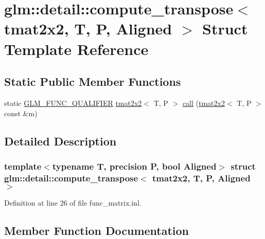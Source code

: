 \hypertarget{structglm_1_1detail_1_1compute__transpose_3_01tmat2x2_00_01_t_00_01_p_00_01_aligned_01_4}{}\section{glm\+::detail\+::compute\+\_\+transpose$<$ tmat2x2, T, P, Aligned $>$ Struct Template Reference}
\label{structglm_1_1detail_1_1compute__transpose_3_01tmat2x2_00_01_t_00_01_p_00_01_aligned_01_4}
\subsection*{Static Public Member Functions}
\begin{DoxyCompactItemize}
\item 
static \mbox{\hyperlink{setup_8hpp_a33fdea6f91c5f834105f7415e2a64407}{G\+L\+M\+\_\+\+F\+U\+N\+C\+\_\+\+Q\+U\+A\+L\+I\+F\+I\+ER}} \mbox{\hyperlink{structglm_1_1tmat2x2}{tmat2x2}}$<$ T, P $>$ \mbox{\hyperlink{structglm_1_1detail_1_1compute__transpose_3_01tmat2x2_00_01_t_00_01_p_00_01_aligned_01_4_a9668df2ce71362d2dd4254439b78c22c}{call}} (\mbox{\hyperlink{structglm_1_1tmat2x2}{tmat2x2}}$<$ T, P $>$ const \&m)
\end{DoxyCompactItemize}


\subsection{Detailed Description}
\subsubsection*{template$<$typename T, precision P, bool Aligned$>$\newline
struct glm\+::detail\+::compute\+\_\+transpose$<$ tmat2x2, T, P, Aligned $>$}



Definition at line 26 of file func\+\_\+matrix.\+inl.



\subsection{Member Function Documentation}
\mbox{\label{structglm_1_1detail_1_1compute__transpose_3_01tmat2x2_00_01_t_00_01_p_00_01_aligned_01_4_a9668df2ce71362d2dd4254439b78c22c}} 
